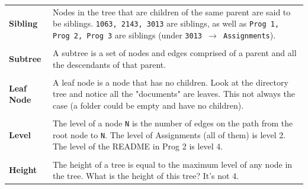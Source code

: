 \begin{center}
\begin{tabular}{p{} p{} }
		\\
		\textbf{Sibling}   &   
		Nodes in the tree that are children of the same parent are said to
		be siblings. \texttt{1063, 2143, 3013} are siblings, as well as \texttt{Prog 1, Prog 2, Prog 3} are siblings (under \texttt{3013 $\rightarrow$ Assignments}).\\
		\\
		\textbf{Subtree}   &   
		A subtree is a set of nodes and edges comprised of a parent and all
		the descendants of that parent.\\
		\\
		\textbf{Leaf Node} &   
		A leaf node is a node that has no children. Look at the directory tree and notice all the "documents" are leaves. This not always the case (a folder could be empty and have no children). \\
		\\
		\textbf{Level}     &   
		The level of a node \texttt{N}  is the number of edges on the path from the
		root node to \texttt{N}. The level of Assignments (all of them) is level 2. The level of the README in Prog 2 is level 4.\\
		\\
		\textbf{Height}    &   
		The height of a tree is equal to the maximum level of any node in
		the tree. What is the height of this tree? It's not 4.\\
		
	\end{tabular}
\end{center}


